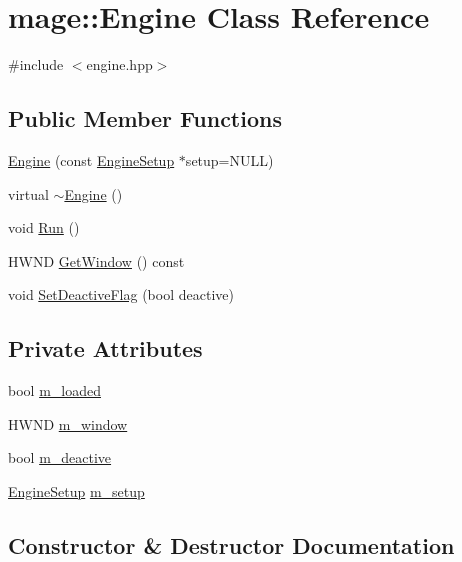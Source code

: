 \hypertarget{classmage_1_1_engine}{}\section{mage\+:\+:Engine Class Reference}
\label{classmage_1_1_engine}


{\ttfamily \#include $<$engine.\+hpp$>$}

\subsection*{Public Member Functions}
\begin{DoxyCompactItemize}
\item 
\hyperlink{classmage_1_1_engine_a5b49f3adf1dd889bb38f5325fd6db317}{Engine} (const \hyperlink{structmage_1_1_engine_setup}{Engine\+Setup} $\ast$setup=N\+U\+LL)
\item 
virtual \hyperlink{classmage_1_1_engine_a34628556f8397d70ed018d71e343c2f5}{$\sim$\+Engine} ()
\item 
void \hyperlink{classmage_1_1_engine_afdc05e214d3f47a6ea3a40dfffd86f80}{Run} ()
\item 
H\+W\+ND \hyperlink{classmage_1_1_engine_a1c5f9d8c68045b36f404251359aa41e4}{Get\+Window} () const
\item 
void \hyperlink{classmage_1_1_engine_a942bfa9892fa79bb1068d7c7ec4e6732}{Set\+Deactive\+Flag} (bool deactive)
\end{DoxyCompactItemize}
\subsection*{Private Attributes}
\begin{DoxyCompactItemize}
\item 
bool \hyperlink{classmage_1_1_engine_a2f8783761b9629dd507d0a6bc456125b}{m\+\_\+loaded}
\item 
H\+W\+ND \hyperlink{classmage_1_1_engine_a48989d564438791281ff5e7bdb78d8bc}{m\+\_\+window}
\item 
bool \hyperlink{classmage_1_1_engine_ab8a4b0157403708ae7d1d018a95b4c63}{m\+\_\+deactive}
\item 
\hyperlink{structmage_1_1_engine_setup}{Engine\+Setup} \hyperlink{classmage_1_1_engine_a4a16598b741fa040600b45a277d38233}{m\+\_\+setup}
\end{DoxyCompactItemize}


\subsection{Constructor \& Destructor Documentation}
\hypertarget{classmage_1_1_engine_a5b49f3adf1dd889bb38f5325fd6db317}{}\label{classmage_1_1_engine_a5b49f3adf1dd889bb38f5325fd6db317} 
